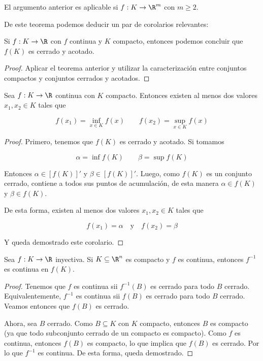\begin{nota}
    El argumento anterior es aplicable si $f: K \rightarrow \R^m$ con $m \geq 2$.
\end{nota}

De este teorema podemos deducir un par de corolarios relevantes:

\begin{cor}
    Si $f: K \rightarrow \R$ con $f$ continua y $K$ compacto, entonces podemos concluir que $f(K)$ es cerrado y acotado.
\end{cor}

\begin{proof}
    Aplicar el teorema anterior y utilizar la caracterización entre conjuntos compactos y conjuntos cerrados y acotados.
\end{proof}

\begin{cor}
    Sea $f: K \rightarrow \R$ continua con $K$ compacto. Entonces existen al menos dos valores $x_1, x_2 \in K$ tales que
    
    \[
    f(x_1) = \inf_{x \in K} f(x) \qquad f(x_2) = \sup_{x \in K} f(x)
    \]
\end{cor}

\begin{proof}
    Primero, tenemos que $f(K)$ es cerrado y acotado. Si tomamos
    
    \[
    \alpha = \inf f(K) \qquad \beta = \sup f(K)
    \]
    
    Entonces $\alpha \in \left[ f(K) \right]'$ y $\beta \in \left[ f(K) \right]'$. Luego, como $f(K)$ es un conjunto cerrado, contiene a todos sus puntos de acumulación, de esta manera $\alpha \in f(K)$ y $\beta \in f(K)$.
    
    De esta forma, existen al menos dos valores $x_1, x_2 \in K$ tales que
    
    \[
    f(x_1) = \alpha \quad \text{y} \quad f(x_2) = \beta
    \]
    
    Y queda demostrado este corolario.
\end{proof}

\begin{teo}
    Sea $f: K \rightarrow \R$ inyectiva. Si $K \subseteq \R^n$ es compacto y $f$ es continua, entonces $f^{-1}$ es continua en $f(K)$.
\end{teo}

\begin{proof}
    Tenemos que $f$ es continua sii $f^{-1}(B)$ es cerrado para todo $B$ cerrado. Equivalentemente, $f^{-1}$ es continua sii $f(B)$ es cerrado para todo $B$ cerrado. Veamos entonces que $f(B)$ es cerrado.
    
    Ahora, sea $B$ cerrado. Como $B \subseteq K$ con $K$ compacto, entonces $B$ es compacto (ya que todo subconjunto cerrado de un compacto es compacto). Como $f$ es continua, entonces $f(B)$ es compacto, lo que implica que $f(B)$ es cerrado. Por lo que $f^{-1}$ es continua. De esta forma, queda demostrado.
\end{proof}

